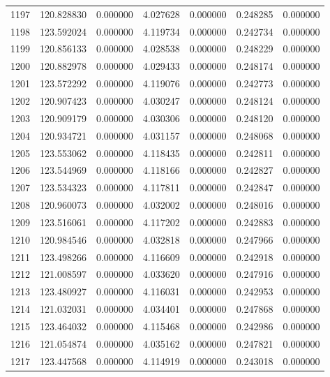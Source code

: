 \begin{tabular}{rrrrrrr}
1197 & 120.828830 &    0.000000 &  4.027628 &   0.000000 &   0.248285 &  0.000000 \\
1198 & 123.592024 &    0.000000 &  4.119734 &   0.000000 &   0.242734 &  0.000000 \\
1199 & 120.856133 &    0.000000 &  4.028538 &   0.000000 &   0.248229 &  0.000000 \\
1200 & 120.882978 &    0.000000 &  4.029433 &   0.000000 &   0.248174 &  0.000000 \\
1201 & 123.572292 &    0.000000 &  4.119076 &   0.000000 &   0.242773 &  0.000000 \\
1202 & 120.907423 &    0.000000 &  4.030247 &   0.000000 &   0.248124 &  0.000000 \\
1203 & 120.909179 &    0.000000 &  4.030306 &   0.000000 &   0.248120 &  0.000000 \\
1204 & 120.934721 &    0.000000 &  4.031157 &   0.000000 &   0.248068 &  0.000000 \\
1205 & 123.553062 &    0.000000 &  4.118435 &   0.000000 &   0.242811 &  0.000000 \\
1206 & 123.544969 &    0.000000 &  4.118166 &   0.000000 &   0.242827 &  0.000000 \\
1207 & 123.534323 &    0.000000 &  4.117811 &   0.000000 &   0.242847 &  0.000000 \\
1208 & 120.960073 &    0.000000 &  4.032002 &   0.000000 &   0.248016 &  0.000000 \\
1209 & 123.516061 &    0.000000 &  4.117202 &   0.000000 &   0.242883 &  0.000000 \\
1210 & 120.984546 &    0.000000 &  4.032818 &   0.000000 &   0.247966 &  0.000000 \\
1211 & 123.498266 &    0.000000 &  4.116609 &   0.000000 &   0.242918 &  0.000000 \\
1212 & 121.008597 &    0.000000 &  4.033620 &   0.000000 &   0.247916 &  0.000000 \\
1213 & 123.480927 &    0.000000 &  4.116031 &   0.000000 &   0.242953 &  0.000000 \\
1214 & 121.032031 &    0.000000 &  4.034401 &   0.000000 &   0.247868 &  0.000000 \\
1215 & 123.464032 &    0.000000 &  4.115468 &   0.000000 &   0.242986 &  0.000000 \\
1216 & 121.054874 &    0.000000 &  4.035162 &   0.000000 &   0.247821 &  0.000000 \\
1217 & 123.447568 &    0.000000 &  4.114919 &   0.000000 &   0.243018 &  0.000000 \\

\end{tabular}
